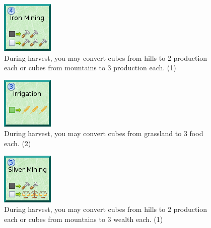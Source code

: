 \documentclass[11pt,a4paper,titlepage]{article}
\begin{document}
{{  \begin{figure}[!htb]
    \begin{minipage}[c]{0.1\textwidth}
      \includegraphics[scale=.7]{doe_tech_iron_mining.png}
    \end{minipage}\hfill
    \begin{minipage}[c]{0.6\textwidth}
      \captionsetup{labelformat=empty, justification=justified, singlelinecheck=false}
      \caption{During harvest, you may convert cubes from hills to 2 production each or cubes from mountains to 3 production each. (1)}
    \end{minipage}\hfill
    \label{fig:tech_iron_mining}
  \end{figure}

  \begin{figure}[!htb]
    \begin{minipage}[c]{0.1\textwidth}
      \includegraphics[scale=.7]{doe_tech_irrigation.png}
    \end{minipage}\hfill
    \begin{minipage}[c]{0.6\textwidth}
      \captionsetup{labelformat=empty, justification=justified, singlelinecheck=false}
      \caption{During harvest, you may convert cubes from grassland to 3 food each. (2)}
    \end{minipage}\hfill
    \label{fig:tech_irrigation}
  \end{figure}

  \begin{figure}[!htb]
    \begin{minipage}[c]{0.1\textwidth}
      \includegraphics[scale=.7]{doe_tech_silver_mining.png}
    \end{minipage}\hfill
    \begin{minipage}[c]{0.6\textwidth}
      \captionsetup{labelformat=empty, justification=justified, singlelinecheck=false}
      \caption{During harvest, you may convert cubes from hills to 2 production each or cubes from mountains to 3 wealth each. (1)}
    \end{minipage}\hfill
    \label{fig:tech_silver_mining}
  \end{figure}

}}
\end{document}
